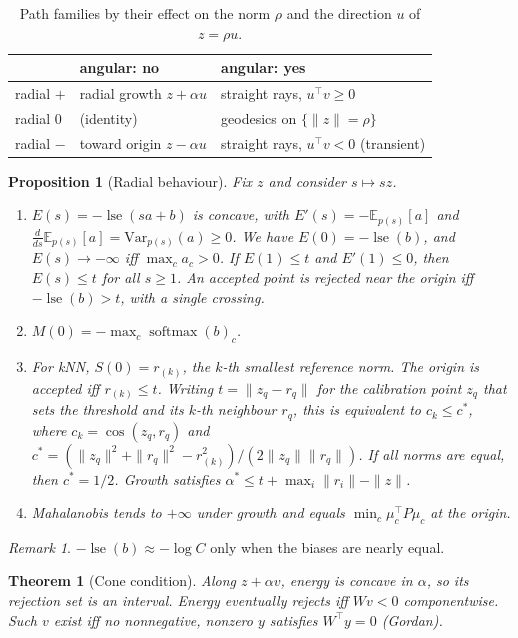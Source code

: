 \documentclass[11pt]{article}
\newtheorem{proposition}{Proposition}
\newtheorem{theorem}{Theorem}
\theoremstyle{definition}
\theoremstyle{remark}
\newtheorem{remark}{Remark}
\DeclareMathOperator{\lse}{lse}
\DeclareMathOperator{\softmax}{softmax}
\begin{document}
\begin{table}[t]
\centering
\caption{Path families by their effect on the norm $\rho$ and the direction $u$ of $z=\rho u$.}
\label{tab:polar}
\begin{tabular}{lll}
\toprule
 & angular: no & angular: yes \\
\midrule
radial $+$ & radial growth $z+\alpha u$ & straight rays, $u^\top v\ge 0$ \\
radial $0$ & (identity) & geodesics on $\{\|z\|=\rho\}$ \\
radial $-$ & toward origin $z-\alpha u$ & straight rays, $u^\top v<0$ (transient) \\
\bottomrule
\end{tabular}
\end{table}

\begin{proposition}[Radial behaviour]\label{prop:radial}
Fix $z$ and consider $s\mapsto sz$.
\begin{enumerate}
\item[(a)] $E(s)=-\lse(sa+b)$ is concave, with $E'(s)=-\mathbb{E}_{p(s)}[a]$ and
$\frac{d}{ds}\mathbb{E}_{p(s)}[a]=\mathrm{Var}_{p(s)}(a)\ge 0$. We have $E(0)=-\lse(b)$, and
$E(s)\to-\infty$ iff $\max_c a_c>0$. If $E(1)\le t$ and $E'(1)\le 0$, then $E(s)\le t$ for all $s\ge1$.
An accepted point is rejected near the origin iff $-\lse(b)>t$, with a single crossing.
\item[(b)] $M(0)=-\max_c\softmax(b)_c$.
\item[(c)] For kNN, $S(0)=r_{(k)}$, the $k$-th smallest reference norm. The origin is accepted iff
$r_{(k)}\le t$. Writing $t=\|z_q-r_q\|$ for the calibration point $z_q$ that sets the threshold and its
$k$-th neighbour $r_q$, this is equivalent to $c_k\le c^*$, where $c_k=\cos(z_q,r_q)$ and
$c^*=(\|z_q\|^2+\|r_q\|^2-r_{(k)}^2)/(2\|z_q\|\|r_q\|)$. If all norms are equal, then $c^*=1/2$.
Growth satisfies $\alpha^*\le t+\max_i\|r_i\|-\|z\|$.
\item[(d)] Mahalanobis tends to $+\infty$ under growth and equals $\min_c\mu_c^\top P\mu_c$ at the origin.
\end{enumerate}
\end{proposition}

\begin{remark}
$-\lse(b)\approx-\log C$ only when the biases are nearly equal.
\end{remark}

\begin{theorem}[Cone condition]\label{thm:cone}
Along $z+\alpha v$, energy is concave in $\alpha$, so its rejection set is an interval. Energy eventually
rejects iff $Wv<0$ componentwise. Such $v$ exist iff no nonnegative, nonzero $y$ satisfies $W^\top y=0$
(Gordan).
\end{theorem}
\end{document}
